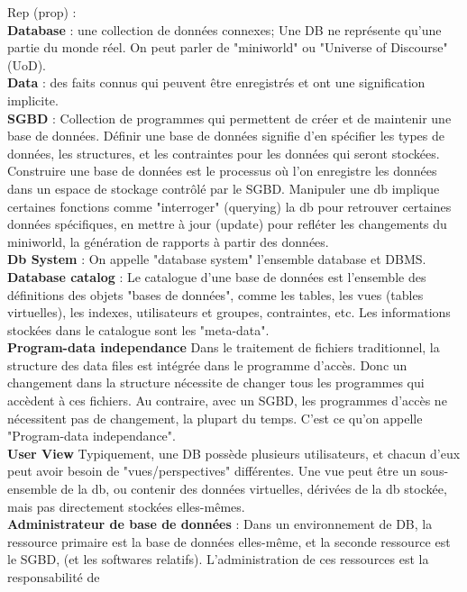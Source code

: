 \noindent
Rep (prop) :\\ 
\textbf{Database} : une collection de données connexes; 
Une DB ne représente qu'une partie du monde réel. On peut parler de 
"miniworld" ou "Universe of Discourse" (UoD). \\
\textbf{Data} : des faits connus qui peuvent être enregistrés et ont une signification 
implicite.\\
\textbf{SGBD} : Collection de programmes qui permettent de créer et de maintenir 
une base de données. 
Définir une base de données signifie d'en spécifier les types de données, 
les structures, et les contraintes pour les données qui seront stockées. 
Construire une base de données est le processus où l'on enregistre les données 
dans un espace de stockage contrôlé par le SGBD. Manipuler une db implique 
certaines fonctions comme "interroger" (querying) la db pour retrouver 
certaines données spécifiques, en mettre à jour (update) pour refléter 
les changements du miniworld, la génération de rapports à partir des données.\\
\textbf{Db System} : On appelle "database system" l'ensemble database et DBMS. \\
\textbf{Database catalog} : Le catalogue d'une base de données est 
l'ensemble des définitions des objets "bases de données", comme les 
tables, les vues (tables virtuelles), les indexes, utilisateurs et groupes, contraintes, etc. Les informations stockées dans le catalogue sont 
les "meta-data".\\
\textbf{Program-data independance} Dans le traitement de fichiers traditionnel, 
la structure des data files est intégrée dans le programme d'accès. 
Donc un changement dans la structure nécessite de changer tous les programmes
qui accèdent à ces fichiers. 
Au contraire, avec un SGBD, les programmes d'accès ne nécessitent pas de changement, 
la plupart du temps. C'est ce qu'on appelle "Program-data independance". \\
\textbf{User View} Typiquement, une DB possède plusieurs utilisateurs, et chacun d'eux 
peut avoir besoin de "vues/perspectives" différentes.  
Une vue peut être un sous-ensemble de la db, ou contenir des 
données virtuelles, dérivées de la db stockée, mais pas directement 
stockées elles-mêmes. \\
\textbf{Administrateur de base de données} : Dans un environnement de DB, 
la ressource primaire est la base de données elles-même, et la seconde 
ressource est le SGBD, (et les softwares relatifs). 
L'administration de ces ressources est la responsabilité de 

